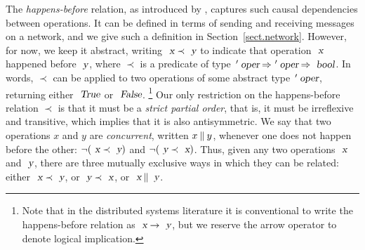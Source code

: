 The \emph{happens-before} relation, as introduced by \citet{Lamport:1978jq}, captures such causal dependencies between operations.
It can be defined in terms of sending and receiving messages on a network, and we give such a definition in Section~\ref{sect.network}.
However, for now, we keep it abstract, writing $\isa{x} \prec \isa{y}$ to indicate that operation $\isa{x}$ happened before $\isa{y}$, where $\prec$ is a predicate of type $\isacharprime\isa{oper} \mathbin{\isasymRightarrow} \isacharprime\isa{oper} \mathbin{\isasymRightarrow} \isa{bool}$.
In words, $\prec$ can be applied to two operations of some abstract type $\isacharprime\isa{oper}$, returning either $\isa{True}$ or $\isa{False}$.%
\footnote{Note that in the distributed systems literature it is conventional to write the happens-before relation as $\isa{x} \rightarrow \isa{y}$, but we reserve the arrow operator to denote logical implication.}
Our only restriction on the happens-before relation $\prec$ is that it must be a \emph{strict partial order}, that is, it must be irreflexive and transitive, which implies that it is also antisymmetric.
We say that two operations $x$ and $y$ are \emph{concurrent}, written $x \mathbin{\emph{$\parallel$}} y$, whenever one does not happen before the other:
$\neg (\isa{x} \prec \isa{y})$ and $\neg (\isa{y} \prec \isa{x})$.
Thus, given any two operations $\isa{x}$ and $\isa{y}$, there are three mutually exclusive ways in which they can be related: either $\isa{x} \prec \isa{y}$, or $\isa{y} \prec \isa{x}$, or $\isa{x} \mathbin{\isasymparallel} \isa{y}$.

